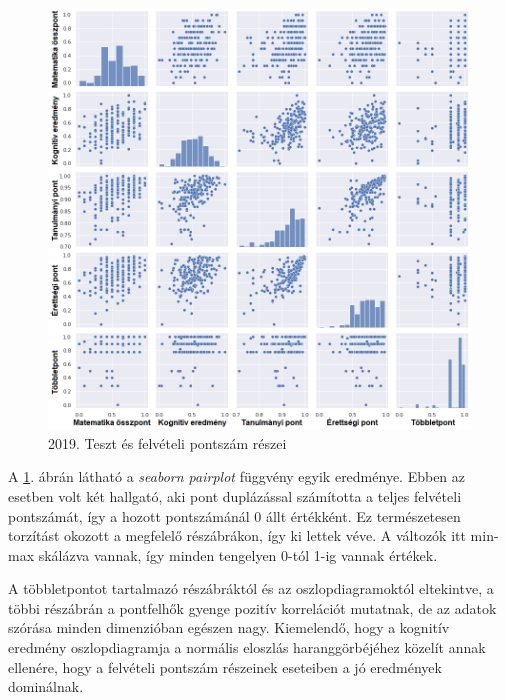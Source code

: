 \documentclass[12pt]{article}
\begin{document}
\begin{figure}[H]
\centering
\includegraphics[width=\textwidth]{kepek/2019minmax3.png}
\caption{2019. Teszt és felvételi pontszám részei}
\label{fig:2019minmax3}
\end{figure}

A \ref{fig:2019minmax3}. ábrán látható a \textit{seaborn pairplot} függvény egyik eredménye. Ebben az esetben volt két hallgató, aki pont duplázással számította a teljes felvételi pontszámát, így a hozott pontszámánál 0 állt értékként. Ez természetesen torzítást okozott a megfelelő részábrákon, így ki lettek véve. A változók itt min-max skálázva vannak, így minden tengelyen 0-tól 1-ig vannak értékek.

A többletpontot tartalmazó részábráktól és az oszlopdiagramoktól eltekintve, a többi részábrán a pontfelhők gyenge pozitív korrelációt mutatnak, de az adatok szórása minden dimenzióban egészen nagy. Kiemelendő, hogy a kognitív eredmény oszlopdiagramja a normális eloszlás haranggörbéjéhez közelít annak ellenére, hogy a felvételi pontszám részeinek eseteiben a jó eredmények dominálnak.
\end{document}
